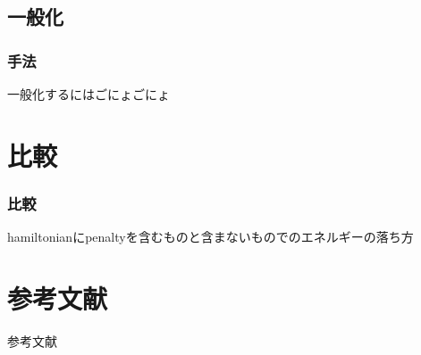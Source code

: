 \subsection{一般化}
\begin{frame}
  \frametitle{手法}
  一般化するにはごにょごにょ
\end{frame}

\section{比較}
\begin{frame}
  \frametitle{比較}
  hamiltonianにpenaltyを含むものと含まないものでのエネルギーの落ち方\\

\end{frame}


\section{参考文献}
\begin{frame}[t]{参考文献}
  \footnotesize

  
  
\end{frame}




